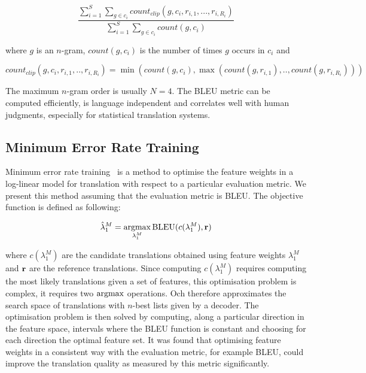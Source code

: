     \begin{equation}
      \frac{\sum_{i=1}^S \sum_{g \in c_i} count_{clip}(g,c_i,r_{i,1},...,r_{i,R_i})}{\sum_{i=1}^S \sum_{g \in c_i} count(g,c_i)}
    \end{equation}

    \noindent where $g$ is an $n$-gram, $count(g,c_i)$ is the number of times $g$ occurs in $c_i$ and 
    
    \begin{equation}
      count_{clip}(g,c_i,r_{i,1},..,r_{i,R_i}) = \min(count(g,c_i),\max(count(g,r_{i,1}),..,count(g,r_{i,R_i})))
    \end{equation}

    The maximum $n$-gram order is usually $N=4$. The BLEU metric can be computed efficiently, is language
    independent and correlates well with human judgments, especially for statistical translation systems.

    \subsection{Minimum Error Rate Training}

    Minimum error rate training~\citep{och:2003:ACL} is a method to optimise the feature weights
    in a log-linear model for translation with respect to a particular evaluation metric. We present
    this method assuming that the evaluation metric is BLEU. The objective function is defined 
    as following:

    \begin{equation}
      \hat{\lambda}_1^M = \operatorname*{argmax}_{\lambda_1^M} \mbox{BLEU}(c(\lambda_1^M), {\bf r}) 
    \end{equation}

    \noindent where $c(\lambda_1^M)$ are the candidate translations obtained using feature
    weights $\lambda_1^M$ and ${\bf r}$ are the reference translations. Since computing $c(\lambda_1^M)$
    requires computing the most likely translations given a set of features, this
    optimisation problem is complex, it requires two $\operatorname*{argmax}$ operations. Och therefore approximates the search space of translations
    with $n$-best lists given by a decoder. The optimisation problem is then solved by 
    computing, along a particular direction in the feature space, intervals where the BLEU function 
    is constant and choosing for each direction the optimal feature set. It was found
    that optimising feature weights in a consistent way with the evaluation metric, for example
    BLEU, could improve the translation quality as measured by this metric significantly.

